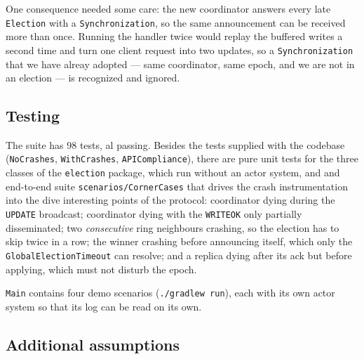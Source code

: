 One consequence needed some care: the new coordinator answers every late \texttt{Election} with a \texttt{Synchronization}, so the same announcement can be received more than once. Running the handler twice would replay the buffered writes a second time and turn one client request into two updates, so a \texttt{Synchronization} that we have alreay adopted --- same coordinator, same epoch, and we are not in an election --- is recognized and ignored.

\subsection*{Testing}

The suite has 98 tests, al passing. Besides the tests supplied with the codebase (\texttt{NoCrashes}, \texttt{WithCrashes}, \texttt{APICompliance}), there are pure unit tests for the three classes of the \texttt{election} package, which run without an actor system, and and end-to-end suite \texttt{scenarios/CornerCases} that drives the crash instrumentation into the dive interesting points of the protocol: coordinator dying during the \texttt{UPDATE} broadcast; coordinator dying with the \texttt{WRITEOK} only partially disseminated; two \emph{consecutive} ring neighbours crashing, so the election has to skip twice in a row; the winner crashing before announcing itself, which only the \texttt{GlobalElectionTimeout} can resolve; and a replica dying after its ack but before applying, which must not disturb the epoch.

\texttt{Main} contains four demo scenarios (\texttt{./gradlew run}), each with its own actor system so that its log can be read on its own.

\subsection*{Additional assumptions}

